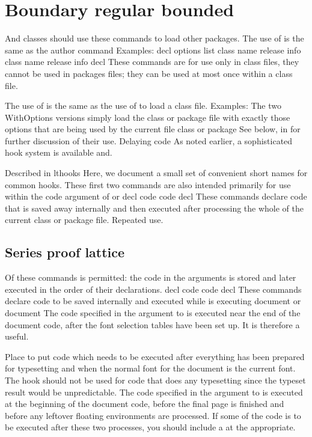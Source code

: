 \documentclass{article}
\begin{document}
\section{Boundary regular bounded}\label{sec4}
And classes should use these commands to load other packages. The use of is the same as the author command Examples: decl options list class name release info class name release info decl These commands are for use only in class files, they cannot be used in packages files; they can be used at most once within a class file.

The use of is the same as the use of to load a class file. Examples: The two WithOptions versions simply load the class or package file with exactly those options that are being used by the current file class or package See below, in for further discussion of their use. Delaying code As noted earlier, a sophisticated hook system is available and.

Described in lthooks Here, we document a small set of convenient short names for common hooks. These first two commands are also intended primarily for use within the code argument of or decl code code decl These commands declare code that is saved away internally and then executed after processing the whole of the current class or package file. Repeated use.

\subsection{Series proof lattice}
Of these commands is permitted: the code in the arguments is stored and later executed in the order of their declarations. decl code code decl These commands declare code to be saved internally and executed while is executing document or document The code specified in the argument to is executed near the end of the document code, after the font selection tables have been set up. It is therefore a useful.

Place to put code which needs to be executed after everything has been prepared for typesetting and when the normal font for the document is the current font. The hook should not be used for code that does any typesetting since the typeset result would be unpredictable. The code specified in the argument to is executed at the beginning of the document code, before the final page is finished and before any leftover floating environments are processed. If some of the code is to be executed after these two processes, you should include a at the appropriate.
\end{document}
